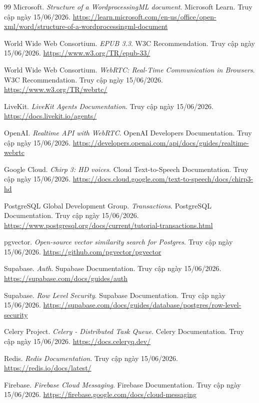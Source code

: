 \documentclass[12pt,a4paper]{report}
\begin{document}
\begin{thebibliography}{99}
Microsoft. \textit{Structure of a WordprocessingML document}. Microsoft Learn. Truy cập ngày 15/06/2026. \url{https://learn.microsoft.com/en-us/office/open-xml/word/structure-of-a-wordprocessingml-document}

World Wide Web Consortium. \textit{EPUB 3.3}. W3C Recommendation. Truy cập ngày 15/06/2026. \url{https://www.w3.org/TR/epub-33/}

World Wide Web Consortium. \textit{WebRTC: Real-Time Communication in Browsers}. W3C Recommendation. Truy cập ngày 15/06/2026. \url{https://www.w3.org/TR/webrtc/}

LiveKit. \textit{LiveKit Agents Documentation}. Truy cập ngày 15/06/2026. \url{https://docs.livekit.io/agents/}

OpenAI. \textit{Realtime API with WebRTC}. OpenAI Developers Documentation. Truy cập ngày 15/06/2026. \url{https://developers.openai.com/api/docs/guides/realtime-webrtc}

Google Cloud. \textit{Chirp 3: HD voices}. Cloud Text-to-Speech Documentation. Truy cập ngày 15/06/2026. \url{https://docs.cloud.google.com/text-to-speech/docs/chirp3-hd}

PostgreSQL Global Development Group. \textit{Transactions}. PostgreSQL Documentation. Truy cập ngày 15/06/2026. \url{https://www.postgresql.org/docs/current/tutorial-transactions.html}

pgvector. \textit{Open-source vector similarity search for Postgres}. Truy cập ngày 15/06/2026. \url{https://github.com/pgvector/pgvector}

Supabase. \textit{Auth}. Supabase Documentation. Truy cập ngày 15/06/2026. \url{https://supabase.com/docs/guides/auth}

Supabase. \textit{Row Level Security}. Supabase Documentation. Truy cập ngày 15/06/2026. \url{https://supabase.com/docs/guides/database/postgres/row-level-security}

Celery Project. \textit{Celery - Distributed Task Queue}. Celery Documentation. Truy cập ngày 15/06/2026. \url{https://docs.celeryq.dev/}

Redis. \textit{Redis Documentation}. Truy cập ngày 15/06/2026. \url{https://redis.io/docs/latest/}

Firebase. \textit{Firebase Cloud Messaging}. Firebase Documentation. Truy cập ngày 15/06/2026. \url{https://firebase.google.com/docs/cloud-messaging}


\end{thebibliography}
\end{document}
